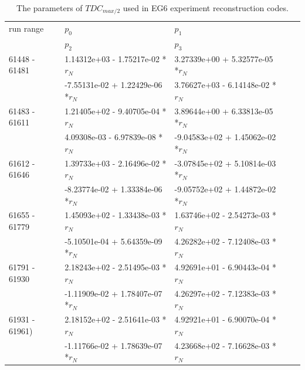 \begin{itemize}
\begin {table}[!h]
\begin{center}
\begin{tabular}{|l|l|l|l|l|}
\hline
run range &  $p_{0}$ &  $p_{1}$ \\&  $p_{2}$ &  $p_{3}$ \\
\hline
61448 - 61481 & 
\small{ 1.14312e+03 - 1.75217e-02 *$r_{N}$} & 
\small{ 3.27339e+00 + 5.32577e-05 *$r_{N}$} \\&
\small{-7.55131e-02 + 1.22429e-06 *$r_{N}$} &  
\small{ 3.76627e+03 - 6.14148e-02 *$r_{N}$}\\
\hline
61483 - 61611 &  
\small{ 1.21405e+02 - 9.40705e-04 *$r_{N}$} & 
\small{ 3.89644e+00 + 6.33813e-05 *$r_{N}$}  \\& 
\small{ 4.09308e-03 - 6.97839e-08 *$r_{N}$} & 
\small{-9.04583e+02 + 1.45062e-02 *$r_{N}$}\\
\hline
61612 - 61646 & 
\small{ 1.39733e+03 - 2.16496e-02 *$r_{N}$} & 
\small{-3.07845e+02 + 5.10814e-03 *$r_{N}$}  \\&
\small{-8.23774e-02 + 1.33384e-06 *$r_{N}$} & 
\small{-9.05752e+02 + 1.44872e-02 *$r_{N}$}\\
\hline
61655 - 61779 &
\small{ 1.45093e+02 - 1.33438e-03 *$r_{N}$} &
\small{ 1.63746e+02 - 2.54273e-03 *$r_{N}$} \\&
\small{-5.10501e-04 + 5.64359e-09 *$r_{N}$} &
\small{ 4.26282e+02 - 7.12408e-03 *$r_{N}$}\\
\hline
61791 - 61930&
\small{ 2.18243e+02 - 2.51495e-03 *$r_{N}$} &
\small{ 4.92691e+01 - 6.90443e-04 *$r_{N}$} \\&
\small{-1.11909e-02 + 1.78407e-07 *$r_{N}$} &
\small{ 4.26297e+02 - 7.12383e-03 *$r_{N}$}\\
\hline
61931 - 61961)&
\small{ 2.18152e+02 - 2.51641e-03 *$r_{N}$} &
\small{ 4.92921e+01 - 6.90070e-04 *$r_{N}$} \\&
\small{-1.11766e-02 + 1.78639e-07 *$r_{N}$} &
\small{ 4.23668e+02 - 7.16628e-03 *$r_{N}$} \\
\hline
\end{tabular}
\caption[]{The parameters of $TDC_{max/2}$ used in EG6 experiment reconstruction codes.}
\label{Table:TDCmax}
\end{center}
\end{table}


\end{itemize}
